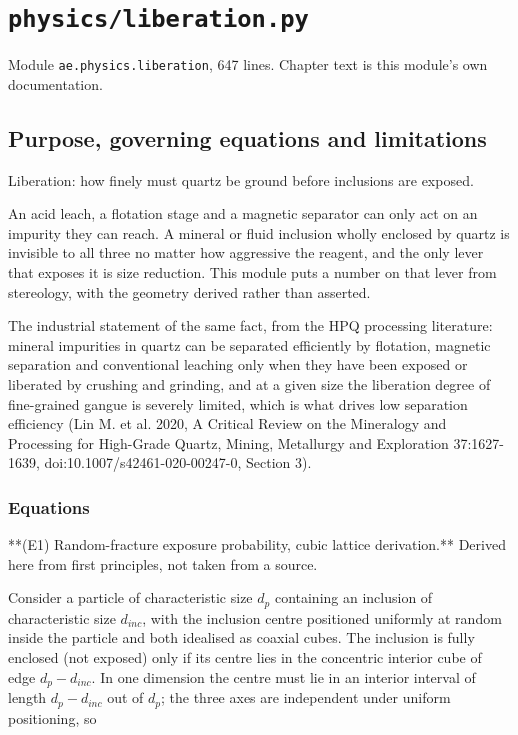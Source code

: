 \documentclass[10pt,a4paper,twoside]{report}
\begin{document}
\chapter{\texttt{physics/liberation.py}}\label{ch:liberation}


{\footnotesize\color{slate}Module \texttt{ae.physics.liberation}, 647 lines. Chapter text is this module's own documentation.\par}

\section{Purpose, governing equations and limitations}

Liberation: how finely must quartz be ground before inclusions are exposed.

An acid leach, a flotation stage and a magnetic separator can only act on an impurity they can reach. A mineral or fluid inclusion wholly enclosed by quartz is invisible to all three no matter how aggressive the reagent, and the only lever that exposes it is size reduction. This module puts a number on that lever from stereology, with the geometry derived rather than asserted.

The industrial statement of the same fact, from the HPQ processing literature: mineral impurities in quartz can be separated efficiently by flotation, magnetic separation and conventional leaching only when they have been exposed or liberated by crushing and grinding, and at a given size the liberation degree of fine-grained gangue is severely limited, which is what drives low separation efficiency (Lin M. et al. 2020, A Critical Review on the Mineralogy and Processing for High-Grade Quartz, Mining, Metallurgy and Exploration 37:1627-1639, doi:10.1007/s42461-020-00247-0, Section 3).

\subsection*{Equations}

**(E1) Random-fracture exposure probability, cubic lattice derivation.** Derived here from first principles, not taken from a source.

Consider a particle of characteristic size $d_p$ containing an inclusion of characteristic size $d_{inc}$, with the inclusion centre positioned uniformly at random inside the particle and both idealised as coaxial cubes. The inclusion is fully enclosed (not exposed) only if its centre lies in the concentric interior cube of edge $d_p - d_{inc}$. In one dimension the centre must lie in an interior interval of length $d_p - d_{inc}$ out of $d_p$; the three axes are independent under uniform positioning, so
\end{document}
